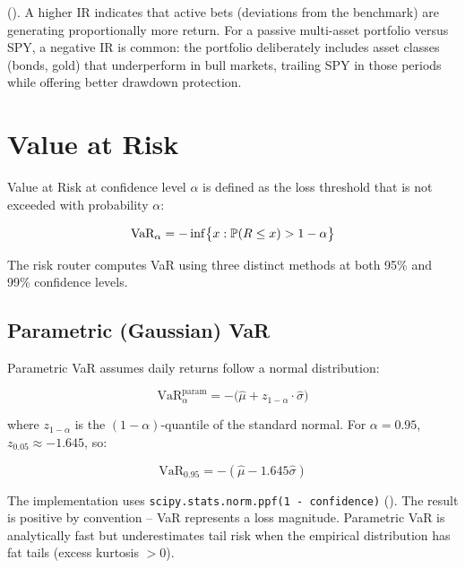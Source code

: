 (). A higher IR indicates that active bets (deviations from the benchmark) are generating proportionally more return. For a passive multi-asset portfolio versus SPY, a negative IR is common: the portfolio deliberately includes asset classes (bonds, gold) that underperform in bull markets, trailing SPY in those periods while offering better drawdown protection.

\section{Value at Risk}
\label{sec:portfolio-var}


Value at Risk at confidence level $\alpha$ is defined as the loss threshold that is not exceeded with probability $\alpha$:

\begin{equation}
  \text{VaR}_\alpha = -\inf\bigl\{x : \operatorname{\mathbb{P}}(R \leq x) > 1 - \alpha\bigr\}
  \label{eq:var-def}
\end{equation}

The risk router computes VaR using three distinct methods at both 95\% and 99\% confidence levels.

\subsection{Parametric (Gaussian) VaR}

Parametric VaR assumes daily returns follow a normal distribution:

\begin{equation}
  \text{VaR}_\alpha^{\text{param}} = -\bigl(\hat{\mu} + z_{1-\alpha} \cdot \hat{\sigma}\bigr)
  \label{eq:var-param}
\end{equation}

where $z_{1-\alpha}$ is the $(1-\alpha)$-quantile of the standard normal. For $\alpha = 0.95$, $z_{0.05} \approx -1.645$, so:

\[
  \text{VaR}_{0.95} = -(\hat{\mu} - 1.645\hat{\sigma})
\]

The implementation uses \texttt{scipy.stats.norm.ppf(1 - confidence)} (). The result is positive by convention -- VaR represents a loss magnitude. Parametric VaR is analytically fast but underestimates tail risk when the empirical distribution has fat tails (excess kurtosis $> 0$).

